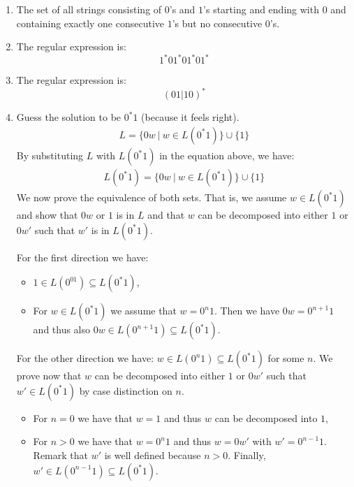 \begin{solution}
    \begin{enumerate}
        \item The set of all strings consisting of $0$'s and $1$'s starting and ending with $0$ and containing exactly one consecutive $1$'s but no consecutive $0$'s.
        \item The regular expression is: 
          \[1^*01^*01^*01^*\]
        \item The regular expression is:
            \[(01 | 10)^*\]
        \item Guess the solution to be  $0^*1$ (because it feels right).
            \begin{align*}
                L = \{0 w \ |\ w\in L(0^*1)\} \cup \{ 1 \}
            \end{align*}
            By substituting $L$ with $L(0^*1)$ in the equation above, we have:
            \begin{align*}
                L(0^*1) = \{0 w \ |\ w\in L(0^*1)\} \cup \{ 1 \}
            \end{align*}
            We now prove the equivalence of both sets. That is, we assume $w \in L(0^*1)$ and show that $0w$ or $1$ is in $L$ and that $w$ can be decomposed into either $1$ or $0w'$ such that $w'$ is in $L(0^*1)$.

            For the first direction we have:
            \begin{itemize}
                \item $1 \in L(0^01) \subseteq L(0^*1)$,
                \item For $w \in L(0^*1)$ we assume that $w=0^n1$. Then we have $0w = 0^{n+1}1$ and thus also $0w \in L(0^{n+1}1) \subseteq L(0^*1)$.
            \end{itemize}

            For the other direction we have: $w \in L(0^n1) \subseteq L(0^*1)$ for some $n$. We prove now that $w$ can be decomposed into either $1$ or $0w'$ such that $w' \in L(0^*1)$ by case distinction on $n$.
            \begin{itemize}
                \item For $n=0$ we have that $w=1$ and thus $w$ can be decomposed into $1$,
                \item For $n>0$ we have that $w=0^n1$ and thus $w=0w'$ with $w'=0^{n-1}1$. Remark that $w'$ is well defined because $n>0$. Finally, $w' \in L(0^{n-1}1) \subseteq L(0^*1)$.
            \end{itemize}
    \end{enumerate}
\end{solution}
